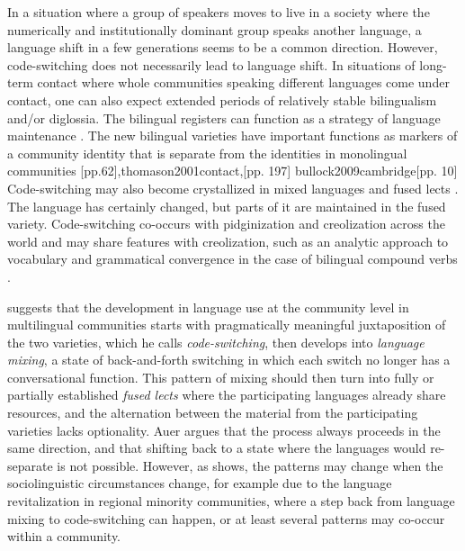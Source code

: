 \documentclass[output=paper,
modfonts
]{langscibook}
\begin{document}
In a situation where a group of speakers moves to live in a society where the numerically and institutionally dominant group speaks another language, a language shift in a few generations seems to be a common direction. However, code-switching does not necessarily lead to language shift. In situations of long-term contact where whole communities speaking different languages come under contact, one can also expect extended periods of relatively stable bilingualism and/or diglossia. The bilingual registers can function as a strategy of language maintenance \parencite{lantto2015code,lantto2016conversations}. The new bilingual varieties have important functions as markers of a community identity that is separate from the identities in monolingual communities \cite{gumperz1982discourse}[pp.62],{thomason2001contact},[pp. 197] {bullock2009cambridge}[pp. 10] Code-switching may also become crystallized in mixed languages and fused lects \parencite{auer1999codeswitching,mcconvell2005gurindji,meakins2011case}.  The language has certainly changed, but parts of it are maintained in the fused variety. Code-switching co-occurs with pidginization and creolization across the world and may share features with creolization, such as an analytic approach to vocabulary and grammatical convergence in the case of bilingual compound verbs \parencite[pp.33--35]{gardner2009code}.

\cite{auer1999codeswitching} suggests that the development in language use at the community level in multilingual communities starts with pragmatically meaningful juxtaposition of the two varieties, which he calls \textit{code-switching}, then develops into \textit{language mixing}, a state of back-and-forth switching in which each switch no longer has a conversational function. This pattern of mixing should then turn into fully or partially established \textit{fused lects} where the participating languages already share resources, and the alternation between the material from the participating varieties lacks optionality. Auer argues that the process always proceeds in the same direction, and that shifting back to a state where the languages would re-separate is not possible. However, as \cite{smith2016regression} shows, the patterns may change when the sociolinguistic circumstances change, for example due to the language revitalization in regional minority communities, where a step back from language mixing to code-switching can happen, or at least several patterns may co-occur within a community. 
\end{document}
